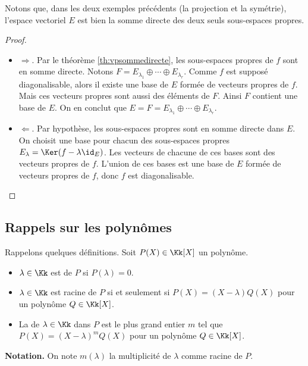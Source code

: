 \documentclass[12pt, class=report,crop=false]{standalone}
\begin{document}
Notons que, dans les deux exemples précédents (la projection et la symétrie), l'espace vectoriel $E$ est bien la somme directe des deux seuls sous-espaces propres.
 
\begin{proof}~
\begin{itemize}

\item $\Longrightarrow$.
Par le théorème \ref{th:vpsommedirecte}, les sous-espaces propres de $f$ sont en somme directe. Notons $F = E_{\lambda_1} \oplus \cdots \oplus  E_{\lambda_r}$. Comme $f$ est supposé diagonalisable, alors il existe une base de $E$ formée de vecteurs propres de $f$. Mais ces vecteurs propres sont aussi des éléments de $F$. Ainsi $F$ contient une base de $E$. On en conclut que $E=F= E_{\lambda_1} \oplus \cdots \oplus  E_{\lambda_r}$. 


\item $\Longleftarrow$.
Par hypothèse, les sous-espaces propres sont en somme directe dans $E$. On choisit une base pour chacun des sous-espaces propres $E_{\lambda}= \Ker (f -\lambda \id_E)$. Les vecteurs de chacune de ces bases sont des vecteurs propres de $f$. L'union de ces bases est une base de $E$ formée de vecteurs propres de $f$, donc $f$ est diagonalisable.

\end{itemize}
\end{proof}


\subsection{Rappels sur les polynômes}



Rappelons quelques définitions.
Soit $P(X) \in \Kk[X]$ un polynôme.
\begin{itemize}
  \item $\lambda \in \Kk$ est  de $P$ si $P(\lambda)=0$.
  \item $\lambda \in \Kk$ est racine de $P$ si et seulement si $P(X) = (X-\lambda) Q(X)$ pour un polynôme $Q \in \Kk[X]$.
  \item La  de $\lambda \in \Kk$ dans $P$ est le plus grand entier $m$ tel que 
  $P(X) = (X-\lambda)^m Q(X)$ pour un polynôme $Q \in \Kk[X]$.
\end{itemize}


\textbf{Notation.}  On note $m(\lambda)$ la multiplicité de $\lambda$ comme racine de $P$.
\end{document}
